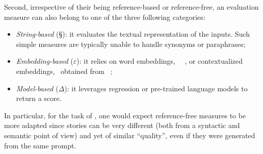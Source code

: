 Second, irrespective of their being reference-based or reference-free, an evaluation measure can also belong to one of the three following categories:

\begin{itemize}[noitemsep]
    \item \emph{String-based} (§): it evaluates the textual representation of the inputs. Such simple measures are typically unable to handle synonyms or paraphrases;
    \item \emph{Embedding-based} ($\varepsilon$): it relies on word embeddings, \eg\ \wvec\ \citep{mikolov2013efficient, mikolov2013distributed}, or contextualized embeddings, \eg\ obtained from \bert\ \citep{devlin-etal-2019-bert};
    \item \emph{Model-based} ($\Delta$): it leverages regression or pre-trained language models to return a score.
\end{itemize}

In particular, for the task of \asefull, one would expect reference-free measures to be more adapted since stories can be very different (both from a syntactic and semantic point of view) and yet of similar ``quality'', even if they were generated from the same prompt.

